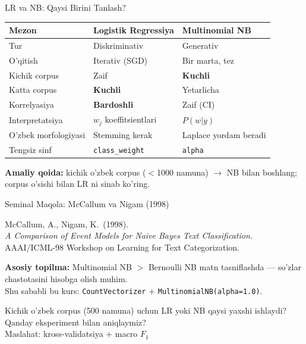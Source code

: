 \documentclass[aspectratio=169,11pt]{beamer}
\begin{document}
\begin{frame}{LR va NB: Qaysi Birini Tanlash?}
  \begin{center}
    \small
    \begin{tabular}{@{}lll@{}}
      \toprule
      Mezon & Logistik Regressiya & Multinomial NB \\
      \midrule
      Tur & Diskriminativ & Generativ \\
      O'qitish & Iterativ (SGD) & Bir marta, tez \\
      Kichik corpus & Zaif & \textcolor{deepgreen}{\textbf{Kuchli}} \\
      Katta corpus & \textcolor{deepgreen}{\textbf{Kuchli}} & Yetarlicha \\
      Korrelyasiya & \textcolor{deepgreen}{\textbf{Bardoshli}} & Zaif (CI) \\
      Interpretatsiya & $w_j$ koeffitsientlari & $P(w|y)$ \\
      O'zbek morfologiyasi & Stemming kerak & Laplace yordam beradi \\
      Tengsiz sinf & \texttt{class\_weight} & \texttt{alpha} \\
      \bottomrule
    \end{tabular}
  \end{center}
  \vspace{4pt}
  \small\textbf{Amaliy qoida:}
  kichik o'zbek corpus ($<$1000 namuna) $\to$ NB bilan boshlang;
  corpus o'sishi bilan LR ni sinab ko'ring.
\end{frame}

\begin{frame}{Seminal Maqola: McCallum va Nigam (1998)}
  \begin{tcolorbox}[defbox,title=Maqola]
    \small
    McCallum, A., Nigam, K.\ (1998).\\
    \textit{A Comparison of Event Models for Naive Bayes
    Text Classification.}\\
    AAAI/ICML-98 Workshop on Learning for Text Categorization.
  \end{tcolorbox}
  \vspace{5pt}
  \small
  \textbf{Asosiy topilma:}
  Multinomial NB $>$ Bernoulli NB matn tasniflashda ---
  so'zlar chastotasini hisobga olish muhim.\\[4pt]
  Shu sababli bu kurs:
  \texttt{CountVectorizer} + \texttt{MultinomialNB(alpha=1.0)}.\\[6pt]
  \begin{tcolorbox}[warnbox,title=Muhokama savoli (P2 gacha o'ylang)]
    \small
    Kichik o'zbek corpus (500 namuna) uchun LR yoki NB qaysi
    yaxshi ishlaydi?  Qanday eksperiment bilan aniqlaymiz?\\
    \textcolor{halfgray}{\footnotesize
      Maslahat: kross-validatsiya + macro $F_1$}
  \end{tcolorbox}
\end{frame}
\end{document}
